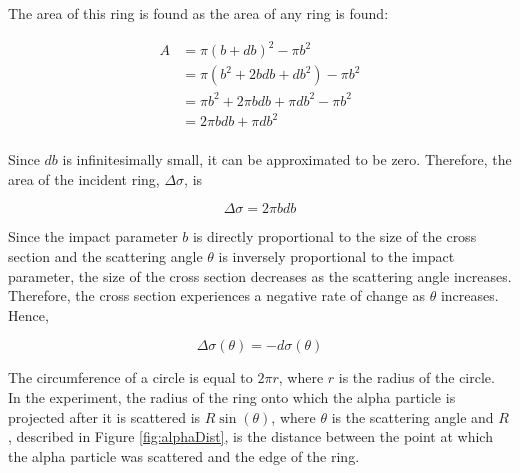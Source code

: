 \documentclass[a4paper]{article}
\begin{document}
The area of this ring is found as the area of any ring is found:

\begin{align*}
  A &= \pi (b + db)^2 - \pi b^2 \\
    &= \pi (b^2 + 2 b db + db^2) - \pi b^2 \\
    &= \pi b^2 + 2 \pi b db + \pi db^2 - \pi b^2 \\
    &= 2 \pi b db + \pi db^2 \\
\end{align*}

Since \( db \) is infinitesimally small, it can be approximated to be
zero. Therefore, the area of the incident ring, \( \Delta \sigma \), is

\begin{equation}
  \Delta \sigma = 2 \pi b db
\end{equation}
\label{eqn:deltaSigma}

%

\qq Since the impact parameter \( b \) is directly proportional to the size of
the cross section and the scattering angle \( \theta \) is inversely
proportional to the impact parameter, the size of the cross section decreases as
the scattering angle increases. Therefore, the cross section experiences a
negative rate of change as \( \theta \) increases. Hence,

\begin{equation}
  \Delta \sigma (\theta) = - d\sigma (\theta)
\end{equation}
\label{eqn:dSigma}

\qq The circumference of a circle is equal to \( 2 \pi r \), where \( r \) is
the radius of the circle. In the experiment, the radius of the ring onto which
the alpha particle is projected after it is scattered is \( R \sin{(\theta)} \),
where \( \theta \) is the scattering angle and \( R \), described in Figure
\ref{fig:alphaDist}, is the distance between the point at which the alpha
particle was scattered and the edge of the ring.
\end{document}
